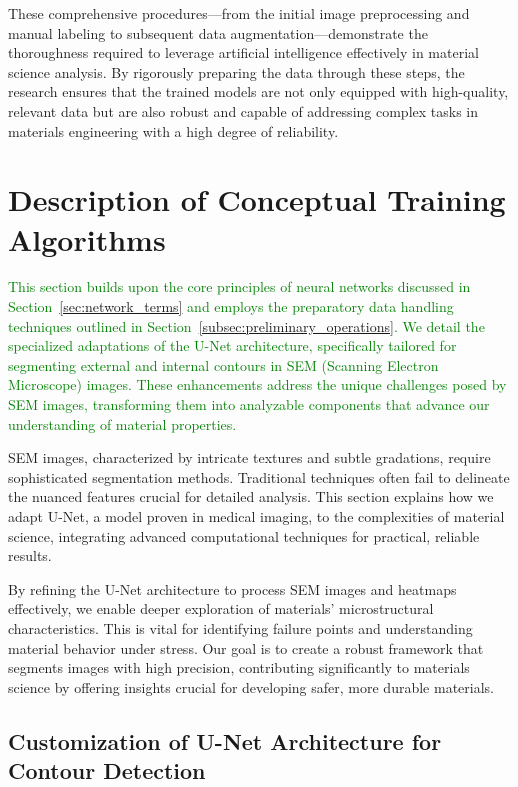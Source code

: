 \documentclass[preprint,12pt]{elsarticle}
\begin{document}
These comprehensive procedures—from the initial image preprocessing and manual labeling to subsequent data augmentation—demonstrate the thoroughness required to leverage artificial intelligence effectively in material science analysis. By rigorously preparing the data through these steps, the research ensures that the trained models are not only equipped with high-quality, relevant data but are also robust and capable of addressing complex tasks in materials engineering with a high degree of reliability.




\section{Description of Conceptual Training Algorithms}
\label{sec:DescriptionConceptualTrainingAlgorithms}

\textcolor{green}{This section builds upon the core principles of neural networks discussed in Section~\ref{sec:network_terms} and employs the preparatory data handling techniques outlined in Section~\ref{subsec:preliminary_operations}. We detail the specialized adaptations of the U-Net architecture, specifically tailored for segmenting external and internal contours in SEM (Scanning Electron Microscope) images. These enhancements address the unique challenges posed by SEM images, transforming them into analyzable components that advance our understanding of material properties.}

SEM images, characterized by intricate textures and subtle gradations, require sophisticated segmentation methods. Traditional techniques often fail to delineate the nuanced features crucial for detailed analysis. This section explains how we adapt U-Net, a model proven in medical imaging, to the complexities of material science, integrating advanced computational techniques for practical, reliable results.

By refining the U-Net architecture to process SEM images and heatmaps effectively, we enable deeper exploration of materials' microstructural characteristics. This is vital for identifying failure points and understanding material behavior under stress. Our goal is to create a robust framework that segments images with high precision, contributing significantly to materials science by offering insights crucial for developing safer, more durable materials.

\subsection{Customization of U-Net Architecture for Contour Detection}
\label{subsec:UNetArchitectureCustomization}
\end{document}
